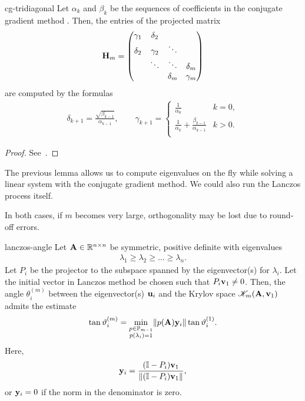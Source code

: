\begin{Lemma}{cg-tridiagonal}
  Let $\alpha_k$ and $\beta_k$ be the sequences of coefficients in the conjugate gradient method
  . Then, the entries of the projected matrix
  \begin{gather}
    \mathbf H_m =
    \begin{pmatrix}
            \gamma_1 & \delta_2\\
      \delta_2 & \gamma_2 & \ddots\\
      &\ddots&\ddots&\delta_m\\
      &&\delta_{m}&\gamma_m
    \end{pmatrix}
  \end{gather}
  are computed by the formulas
  \begin{gather}
    \delta_{k+1} = \frac{\sqrt{\beta_{k-1}}}{\alpha_{k-1}},
    \qquad
    \gamma_{k+1} =
    \begin{cases}
      \tfrac1{\alpha_0}&k=0,\\
      \tfrac1{\alpha_k} + \tfrac{\beta_{k-1}}{\alpha_{k-1}} &k>0.\\
    \end{cases}
  \end{gather}
\end{Lemma}

\begin{proof}
  See~\cite[Section 6.7.3]{Saad00}.
\end{proof}

\begin{remark}
  The previous lemma allows us to compute eigenvalues on the fly while
  solving a linear system with the conjugate gradient method. We could
  also run the Lanczos process  itself.

  In both cases, if $m$ becomes very large, orthogonality may be lost
  due to round-off errors.
\end{remark}

\begin{Lemma}{lanczos-angle}
  Let $\mathbf A\in\mathbb R^{n\times n}$ be symmetric, positive definite with eigenvalues
  \begin{gather}
    \lambda_1 \ge \lambda_2 \ge \dots \ge \lambda_n.
  \end{gather}
  Let $P_i$ be the projector to the subspace spanned by the
  eigenvector(s) for $\lambda_i$. Let the initial vector in Lanczos
  method be chosen such that $P_i \mathbf v_1\neq 0$. Then, the angle
  $\theta_i^{(m)}$ between the eigenvector(s) $\mathbf u_i$ and the Krylov space
  $\mathscr K_m(\mathbf A,\mathbf v_1)$ admits the estimate
  \begin{gather}
    \tan\vartheta_i^{(m)} = \min_{\substack{p\in\mathbb P_{m-1}\\p(\lambda_i)=1}} \lVert p(\mathbf A)\mathbf y_i\rVert \tan \vartheta_i^{(1)}.
  \end{gather}
  Here,
  \begin{gather}
    \mathbf y_i = \frac{(\mathbb I-P_i)\mathbf v_1}{\lVert(\mathbb I-P_i)\mathbf v_1\rVert},
  \end{gather}
  or $\mathbf y_i=0$ if the norm in the denominator is zero.
\end{Lemma}

